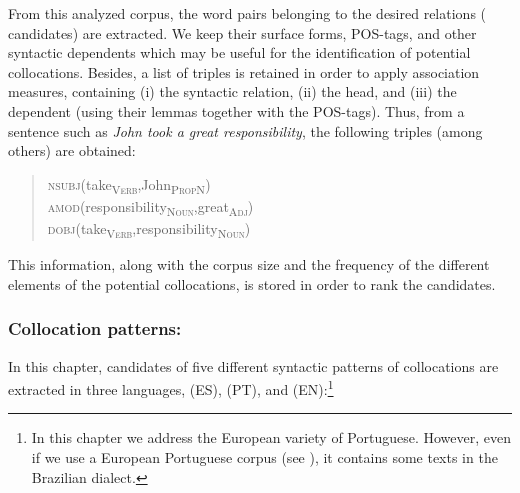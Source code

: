 \documentclass[output=paper,modfonts,nonflat]{langsci/langscibook}
\begin{document}
From this analyzed corpus, the word pairs belonging to the desired relations
( candidates) are extracted. We keep their surface forms, POS-tags,
and other syntactic dependents which may be useful for the identification
of potential collocations. Besides, a list of triples is retained in order to apply association measures,
containing (i) the syntactic relation, (ii) the head, and (iii) the dependent (using their lemmas
together with the POS-tags). Thus, from a sentence such as \emph{John took a great responsibility},
the following triples (among others) are obtained:

\begin{quotation}
  \noindent\textsc{nsubj}(take\textsubscript{\textsc{Verb}},John\textsubscript{\textsc{PropN}})\\
  \textsc{amod}(responsibility\textsubscript{\textsc{Noun}},great\textsubscript{\textsc{Adj}})\\
  \textsc{dobj}(take\textsubscript{\textsc{Verb}},responsibility\textsubscript{\textsc{Noun}})
\end{quotation}

This information, along with the corpus size and the frequency of the different elements
of the potential collocations, is stored in order to rank the candidates.

\subsubsection{Collocation patterns:} In this chapter, candidates of five different syntactic
patterns of collocations are extracted in three languages,  (ES),  (PT), and  (EN):\footnote{In this chapter we address the European variety of Portuguese.
  However, even if we use a European Portuguese corpus (see ),
  it contains some texts in the Brazilian dialect.}
\end{document}
